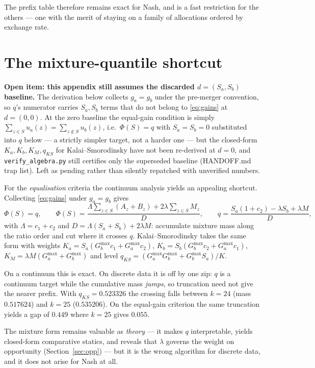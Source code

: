 \documentclass[11pt]{article}
\theoremstyle{remark}\newtheorem*{remark}{Remark}
\newcommand{\Sa}{S_a}\newcommand{\Sb}{S_b}\newcommand{\Amax}{G_a^{\max}}\newcommand{\Bmax}{G_b^{\max}}
\begin{document}
\noindent The prefix table therefore remains exact for Nash, and is a fast restriction
for the others --- one with the merit of staying on a family of allocations ordered by
exchange rate.

\section{The mixture-quantile shortcut}\label{app:mixture}

\begin{warnbox}
\textbf{Open item: this appendix still assumes the discarded $d=(\Sa,\Sb)$ baseline.}
The derivation below collects $g_a=g_b$ under the pre-merger convention, so $q$'s
numerator carries $\Sa,\Sb$ terms that do not belong to \eqref{eq:gains} at $d=(0,0)$.
At the zero baseline the equal-gain condition is simply
$\sum_{z\in S}u_a(z)=\sum_{z\notin S}u_b(z)$, i.e.\ $\Phi(S)=q$ with $\Sa=\Sb=0$
substituted into $q$ below --- a strictly simpler target, not a harder one --- but the
closed-form $K_a,K_b,K_M,q_{KS}$ for Kalai--Smorodinsky have not been re-derived at
$d=0$, and \texttt{verify\_algebra.py} still certifies only the superseded baseline
(HANDOFF.md trap list). Left as pending rather than silently repatched with unverified
numbers.
\end{warnbox}

For the \emph{equalisation} criteria the continuum analysis yields an appealing
shortcut. Collecting \eqref{eq:gains} under $g_a=g_b$ gives
\begin{equation}
\Phi(S)=q,\qquad
\Phi(S)=\frac{\Lambda\sum_{z\in S}(A_z+B_z)+2\lambda\sum_{z\in S}M_z}{D},
\qquad q=\frac{\Sa(1+c_2)-\lambda\Sb+\lambda M}{D},
\end{equation}
with $\Lambda=c_1+c_2$ and $D=\Lambda(\Sa+\Sb)+2\lambda M$: accumulate mixture mass
along the ratio order and cut where it crosses $q$. Kalai--Smorodinsky takes the same
form with weights $K_a=\Sa(\Bmax c_1+\Amax c_2)$, $K_b=\Sb(\Bmax c_2+\Amax c_1)$,
$K_M=\lambda M(\Amax+\Bmax)$ and level $q_{KS}=(\Amax\Bmax+\Bmax\Sa)/K$.

\begin{warnbox}
On a continuum this is exact. On discrete data it is off by one zip: $q$ is a continuum
target while the cumulative mass \emph{jumps}, so truncation need not give the nearer
prefix. With $q_{KS}=0.523326$ the crossing falls between $k=24$ (mass $0.517624$) and
$k=25$ ($0.535206$). On the equal-gain criterion the same truncation yields a gap of
$0.449$ where $k=25$ gives $0.055$.
\end{warnbox}

\noindent The mixture form remains valuable as \emph{theory} --- it makes $q$
interpretable, yields closed-form comparative statics, and reveals that $\lambda$
governs the weight on opportunity (Section~\ref{sec:opp}) --- but it is the wrong
algorithm for discrete data, and it does not arise for Nash at all.



\end{document}
